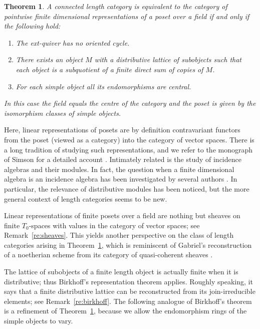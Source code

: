 \documentclass[a4paper]{amsart}
\theoremstyle{plain}
\newtheorem{thm}{Theorem}[section]
\theoremstyle{definition}
\theoremstyle{remark}
\numberwithin{equation}{section}
\begin{document}
\begin{thm}\label{th:main}
  A connected length category is equivalent to the category of
  pointwise finite dimensional representations of a poset over a field
  if and only if the following hold:
  \begin{enumerate}
  \item[(L1)] The ext-quiver  has no oriented cycle.
  \item[(L2)] There exists an object $M$ with a distributive lattice of
    subobjects such that each object is a subquotient of a finite
    direct sum of copies of $M$.
  \item[(L3)] For each simple object all its endomorphisms are central. 
\end{enumerate}
In this case the field equals the centre of the category and the poset
is given by the isomorphism classes of simple objects.
\end{thm}

Here, linear representations of posets are by definition contravariant
functors from the poset (viewed as a category) into the category of
vector spaces.  There is a long tradition of studying such
representations, and we refer to the monograph of Simson for a
detailed account \cite{Si1992}. Intimately related is the study of
incidence algebras and their modules. In fact, the question when a
finite dimensional algebra is an incidence algebra has been
investigated by several authors \cite{BM1979,Fe1977,IK2022}. In
particular, the relevance of distributive modules has been noticed,
but the more general context of length categories seems to be new.

Linear representations of finite posets over a field are
nothing but sheaves on finite $T_0$-spaces with values
in the category of vector spaces; see Remark~\ref{re:sheaves}. This
yields another perspective on the class of length categories arising
in Theorem~\ref{th:main}, which is reminiscent of Gabriel's
reconstruction of a noetherian scheme from its category of
quasi-coherent sheaves \cite[VI]{Ga1962}.

The lattice of subobjects of a finite length object is actually finite
when it is distributive; thus Birkhoff's representation theorem
applies. Roughly speaking, it says that a finite distributive lattice
can be reconstructed from its join-irreducible elements; see
Remark~\ref{re:birkhoff}.  The following analogue of Birkhoff's
theorem is a refinement of Theorem~\ref{th:main}, because we allow the
endomorphism rings of the simple objects to vary.
\end{document}
